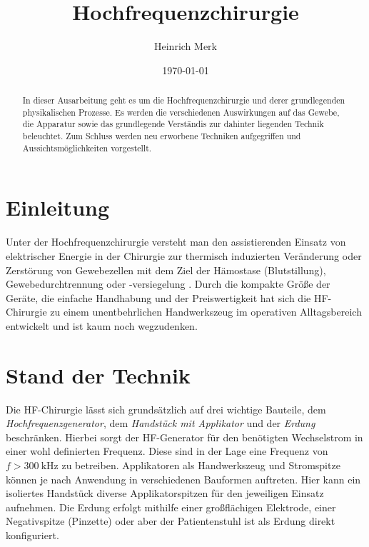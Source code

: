 \documentclass[letterpaper,12pt]{article}
\begin{document}
	
	\title{Hochfrequenzchirurgie}
	\author{Heinrich Merk}
	\date{\today}
	\maketitle
	
	\begin{abstract}
		In dieser Ausarbeitung geht es um die Hochfrequenzchirurgie und derer grundlegenden physikalischen Prozesse. Es werden die verschiedenen Auswirkungen auf das Gewebe, die Apparatur sowie das grundlegende Verständis zur dahinter liegenden Technik beleuchtet. Zum Schluss werden neu erworbene Techniken aufgegriffen und Aussichtsmöglichkeiten vorgestellt.
		
	\end{abstract}
	
	\section{Einleitung}
	
		Unter der Hochfrequenzchirurgie versteht man den assistierenden Einsatz von elektrischer Energie in der Chirurgie zur thermisch induzierten Veränderung oder Zerstörung von Gewebezellen mit dem Ziel der Hämostase (Blutstillung), Gewebedurchtrennung oder -versiegelung \cite{kramme2016medizintechnik}. Durch die kompakte Größe der Geräte, die einfache Handhabung und der Preiswertigkeit hat sich die HF-Chirurgie zu einem unentbehrlichen Handwerkszeug im operativen Alltagsbereich entwickelt und ist kaum noch wegzudenken.
	
	\section{Stand der Technik}
	
		Die HF-Chirurgie lässt sich grundsätzlich auf drei wichtige Bauteile, dem \emph{Hochfrequenzgenerator}, dem \emph{Handstück mit Applikator} und der \emph{Erdung} beschränken. Hierbei sorgt der HF-Generator für den benötigten Wechselstrom in einer wohl definierten Frequenz. Diese sind in der Lage eine Frequenz von $f>\SI{300}{\kilo\hertz}$ zu betreiben. Applikatoren als Handwerkszeug und Stromspitze können je nach Anwendung in verschiedenen Bauformen auftreten. Hier kann ein isoliertes Handstück diverse Applikatorspitzen für den jeweiligen Einsatz aufnehmen. Die Erdung erfolgt mithilfe einer großflächigen Elektrode, einer Negativspitze (Pinzette) oder aber der Patientenstuhl ist als Erdung direkt konfiguriert. 
		
\end{document}
